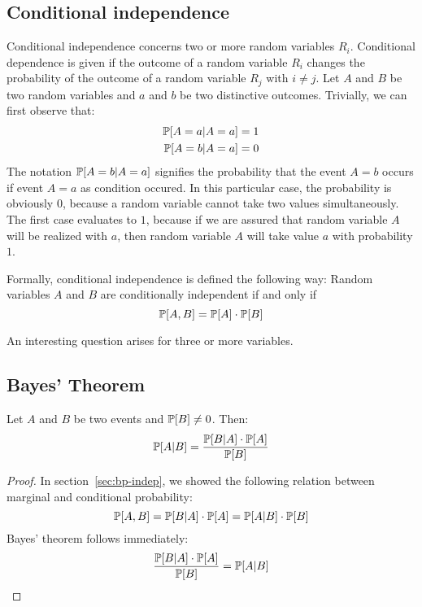 
\subsection{Conditional independence}
\label{sec:bp-cond-indep}
%
Conditional independence concerns two or more random variables $R_i$.
Conditional dependence is given if the outcome of a random variable $R_i$ changes the probability of the outcome of a random variable $R_j$ with $i \neq j$.
Let $A$ and $B$ be two random variables and $a$ and $b$ be two distinctive outcomes. Trivially, we can first observe that:
\begin{align*}
  \mathbb P[A=a|A=a] &= 1 \\
  \mathbb P[A=b|A=a] &= 0
\end{align*}
The notation $\mathbb P[A=b|A=a]$ signifies the probability that the event $A=b$ occurs if event $A=a$ as condition occured. In this particular case, the probability is obviously $0$, because a random variable cannot take two values simultaneously. The first case evaluates to $1$, because if we are assured that random variable $A$ will be realized with $a$, then random variable $A$ will take value $a$ with probability $1$.

Formally, conditional independence is defined the following way: Random variables $A$ and $B$ are conditionally independent if and only if
\[ \mathbb P[A, B] = \mathbb P[A] \cdot \mathbb P[B] \]

An interesting question arises for three or more variables.


\subsection{Bayes' Theorem}
\label{sec:bp-bayes}
%
\begin{theorem}
  Let $A$ and $B$ be two events and $\mathbb P[B] \neq 0$. Then:
  \[ \mathbb P[A|B] = \frac{\mathbb P[B|A] \cdot \mathbb P[A]}{\mathbb P[B]} \]
\end{theorem}
\begin{proof}
  In section~\ref{sec:bp-indep}, we showed the following relation between marginal and conditional probability:
  \[ \mathbb P[A,B] = \mathbb P[B|A] \cdot \mathbb P[A] = \mathbb P[A|B] \cdot \mathbb P[B] \]
  Bayes' theorem follows immediately:
  \[ \frac{\mathbb P[B|A] \cdot \mathbb P[A]}{\mathbb P[B]} = \mathbb P[A|B] \]
\end{proof}

